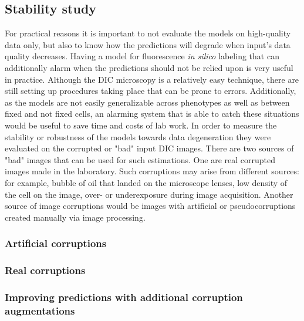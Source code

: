\subsection{Stability study}
    For practical reasons it is important to not evaluate the models on high-quality data only, but also to know how the predictions will degrade when input's data quality decreases. Having a model for fluorescence \textit{in silico} labeling that can additionally alarm when the predictions should not be relied upon is very useful in practice. Although the DIC microscopy is a relatively easy technique, there are still setting up procedures taking place that can be prone to errors. Additionally, as the models are not easily generalizable across phenotypes as well as between fixed and not fixed cells, an alarming system that is able to catch these situations would be useful to save time and costs of lab work. In order to measure the stability or robustness of the models towards data degeneration they were evaluated on the corrupted or "bad" input DIC images. There are two sources of "bad" images that can be used for such estimations. One are real corrupted images made in the laboratory. Such corruptions may arise from different sources: for example, bubble of oil that landed on the microscope lenses, low density of the cell on the image, over- or underexposure during image acquisition. Another source of image corruptions would be images with artificial or pseudocorruptions created manually via image processing. 
    
    \subsubsection{Artificial corruptions}
        
    \subsubsection{Real corruptions}
        
    \subsubsection{Improving predictions with additional corruption augmentations}
        \label{section:augments-againts-corruptions}
        